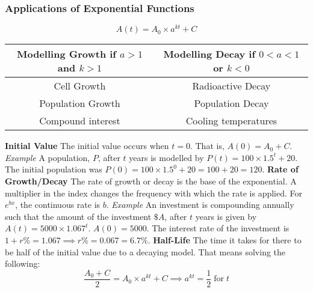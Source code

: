 \documentclass{article}
\begin{document}
			\subsubsection{Applications of Exponential Functions}
				\[A(t)=A_0\times a^{kt}+C\]
				\begin{center}
					\bgroup
					\def\arraystretch{1.5}
					\begin{tabular}{|c|c|}
						\hline
						Modelling Growth if $a>1$ and $k>1$ & Modelling Decay if $0<a<1$ or $k<0$ \\
						\hline
						Cell Growth & Radioactive Decay \\
						\hline
						Population Growth & Population Decay \\
						\hline
						Compound interest & Cooling temperatures \\
						\hline
					\end{tabular}
					\egroup
				\end{center}
				\noindent\textbf{Initial Value}\newline
				The initial value occurs when $t=0$. That is, $A(0)=A_0 + C$.\newline\newline
				\textit{Example}\newline
				A population, $P$, after $t$ years is modelled by $P(t) = 100\times 1.5^t + 20$. The initial population was $P(0)=100\times1.5^0+20=100+20=120$.\newline\newline
				\textbf{Rate of Growth/Decay}\newline
				The rate of growth or decay is the base of the exponential. A multiplier in the index changes the frequency with which the rate is applied. For $e^{bx}$, the continuous rate is $b$.\newline\newline
				\textit{Example}\newline
				An investment is compounding annually such that the amount of the investment $\$A$, after $t$ years is given by $A(t)=5000\times1.067^t$. $A(0)=5000$. The interest rate of the investment is $1+r\% = 1.067 \implies r\%=0.067=6.7\%$.\newline\newline
				\textbf{Half-Life}\newline
				The time it takes for there to be half of the initial value due to a decaying model. That means solving the following:
				\[
					\frac{A_0+C}{2}=A_0\times a^{kt}+C\implies a^{kt}=\frac{1}{2}\;\text{for}\;t
				\]
\end{document}
